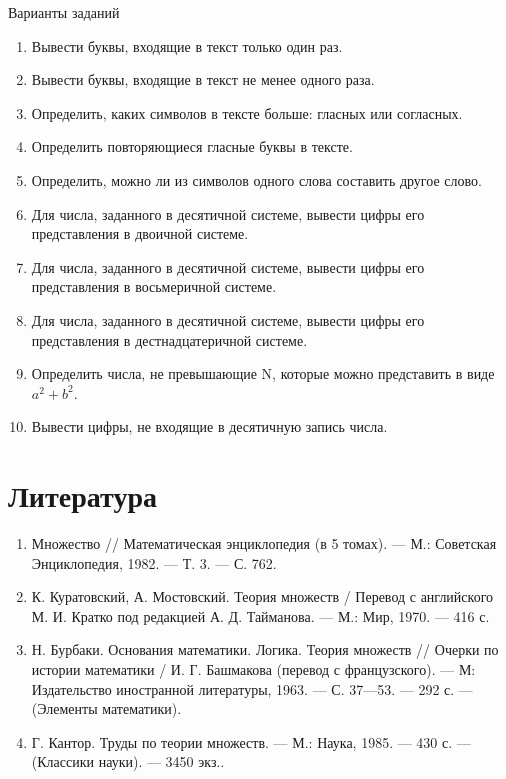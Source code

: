\documentclass{beamer}
\begin{document}
\begin{frame}{Варианты заданий}
\begin{enumerate}
\item Вывести буквы, входящие в текст только один раз.
\item Вывести буквы, входящие в текст не менее одного раза.
\item Определить, каких символов в тексте больше: гласных или согласных.
\item Определить повторяющиеся гласные буквы в тексте.
\item Определить, можно ли из символов одного слова составить другое слово.
\item Для числа, заданного в десятичной системе, вывести цифры его представления в двоичной системе.
\item Для числа, заданного в десятичной системе, вывести цифры его представления в восьмеричной системе.
\item Для числа, заданного в десятичной системе, вывести цифры его представления в дестнадцатеричной системе.
\item Определить числа, не превышающие N, которые можно представить в виде $a^{2} + b^{2}$.
\item Вывести цифры, не входящие в десятичную запись числа.
\end{enumerate}
\end{frame} 
   
\section*{Литература}
\begin{frame}   
\begin{enumerate}
\item Множество // Математическая энциклопедия (в 5 томах). — М.: Советская Энциклопедия, 1982. — Т. 3. — С. 762.
\item К. Куратовский, А. Мостовский. Теория множеств / Перевод с английского М. И. Кратко под редакцией А. Д. Тайманова. — М.: Мир, 1970. — 416 с.
\item Н. Бурбаки. Основания математики. Логика. Теория множеств // Очерки по истории математики / И. Г. Башмакова (перевод с французского). — М: Издательство иностранной литературы, 1963. — С. 37—53. — 292 с. — (Элементы математики).
\item Г. Кантор. Труды по теории множеств. — М.: Наука, 1985. — 430 с. — (Классики науки). — 3450 экз..
\end{enumerate}
\end{frame}   
\end{document}
